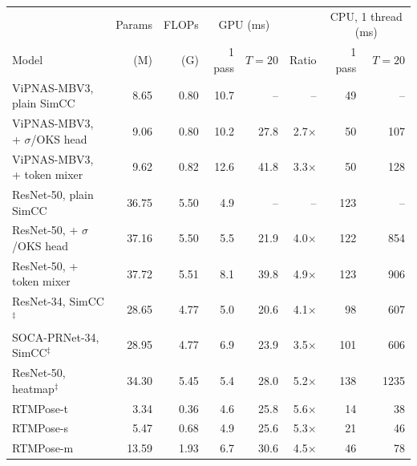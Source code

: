 \begin{tabular}{lrrrrrrr}
\toprule
& Params & FLOPs & \multicolumn{2}{c}{GPU (ms)} & & \multicolumn{2}{c}{CPU, 1 thread (ms)} \\
Model & (M) & (G) & 1 pass & $T{=}20$ & Ratio & 1 pass & $T{=}20$ \\
\midrule
ViPNAS-MBV3, plain SimCC & 8.65 & 0.80 & 10.7 & -- & -- & 49 & -- \\
ViPNAS-MBV3, + $\sigma$/OKS head & 9.06 & 0.80 & 10.2 & 27.8 & 2.7$\times$ & 50 & 107 \\
ViPNAS-MBV3, + token mixer & 9.62 & 0.82 & 12.6 & 41.8 & 3.3$\times$ & 50 & 128 \\
ResNet-50, plain SimCC & 36.75 & 5.50 & 4.9 & -- & -- & 123 & -- \\
ResNet-50, + $\sigma$/OKS head & 37.16 & 5.50 & 5.5 & 21.9 & 4.0$\times$ & 122 & 854 \\
ResNet-50, + token mixer & 37.72 & 5.51 & 8.1 & 39.8 & 4.9$\times$ & 123 & 906 \\
ResNet-34, SimCC$^{\ddagger}$ & 28.65 & 4.77 & 5.0 & 20.6 & 4.1$\times$ & 98 & 607 \\
SOCA-PRNet-34, SimCC$^{\ddagger}$ & 28.95 & 4.77 & 6.9 & 23.9 & 3.5$\times$ & 101 & 606 \\
ResNet-50, heatmap$^{\ddagger}$ & 34.30 & 5.45 & 5.4 & 28.0 & 5.2$\times$ & 138 & 1235 \\
RTMPose-t & 3.34 & 0.36 & 4.6 & 25.8 & 5.6$\times$ & 14 & 38 \\
RTMPose-s & 5.47 & 0.68 & 4.9 & 25.6 & 5.3$\times$ & 21 & 46 \\
RTMPose-m & 13.59 & 1.93 & 6.7 & 30.6 & 4.5$\times$ & 46 & 78 \\
\bottomrule
\end{tabular}
